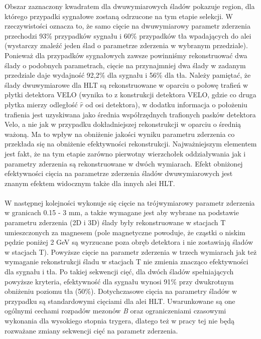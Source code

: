 \documentclass{pracamgr}
\begin{document}
Obszar zaznaczony kwadratem dla dwuwymiarowych śladów pokazuje region, dla którego przypadki sygnałowe zostaną odrzucone na tym etapie selekcji. W rzeczywistości oznacza to, że samo cięcie na dwuwymiarowy parametr zderzenia przechodzi 93\% przypadków sygnału i 60\% przypadków tła wpadających do alei (wystarczy znaleźć jeden ślad o parametrze zderzenia w wybranym przedziale). Ponieważ dla przypadków sygnałowych zawsze powinniśmy rekonstruować dwa ślady o podobnych parametrach, cięcie na przynajmniej dwa ślady w zadanym przedziale daje wydajność 92,2\% dla sygnału i 56\% dla tła. Należy pamiętać, że ślady dwuwymiarowe dla HLT są rekonstruowane w oparciu o połowę trafień w płytki detektora VELO (wynika to z konstrukcji detektora VELO, gdzie co druga płytka mierzy odległość $\hat{r}$ od osi detektora), w dodatku informacja o położeniu trafienia jest uzyskiwana jako średnia współrzędnych trafionych pasków detektora Velo, a nie jak w przypadku dokładniejszej rekonstrukcji w oparciu o średnią ważoną. Ma to wpływ na obniżenie jakości wyniku parametru zderzenia co przekłada się na obniżenie efektywności rekonstrukcji. Najważniejszym elementem jest fakt, że na tym etapie zarówno pierwotny wierzchołek oddziaływania jak i parametry zderzenia są rekonstruowane w dwóch wymiarach. Efekt obniżonej efektywności cięcia na parametrze zderzenia śladów dwuwymiarowych jest znanym efektem widocznym także dla innych alei HLT.
\\\\
\noindent
W następnej kolejności wykonuje się cięcie na trójwymiarowy parametr zderzenia w granicach 0.15 - 3 mm, a także wymagane jest aby wybrane na podstawie parametru zderzenia (2D i 3D) ślady były rekonstruowane w stacjach T umieszczonych za magnesem (pole magnetyczne powoduje, że cząstki o niskim pędzie poniżej 2 GeV są wyrzucane poza obręb detektora i nie zostawiają śladów w stacjach T). Powyższe cięcie na parametr zderzenia w trzech wymiarach jak też wymaganie rekonstrukcji śladu w stacjach T nie zmienia znacząco efektywności dla sygnału i tła. Po takiej sekwencji cięć, dla dwóch śladów spełniających powyższe kryteria, efektywność dla sygnału wynosi 91\% przy dwukrotnym obniżeniu poziomu tła (50\%). Dotychczasowe cięcia na parametry śladów w przypadku są standardowymi cięciami dla alei HLT. Uwarunkowane są one ogólnymi cechami rozpadów mezonów \textit{B} oraz ograniczeniami czasowymi wykonania dla wysokiego stopnia trygera, dlatego też w pracy tej nie będą rozważane zmiany sekwencji cięć na parametr zderzenia. 
\\\\
\end{document}
